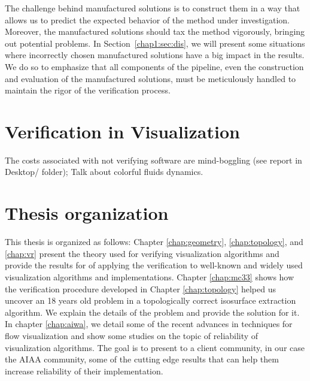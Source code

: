 The challenge behind manufactured solutions is to construct them in a
way that allows us to predict the expected behavior of the method
under investigation.  Moreover, the manufactured solutions should tax
the method vigorously, bringing out potential problems. In
Section~\ref{chap1:sec:dis}, we will present some situations where
incorrectly chosen manufactured solutions have a big impact in the
results.  We do so to emphasize that all components of the pipeline,
even the construction and evaluation of the manufactured solutions,
must be meticulously handled to maintain the rigor of the verification
process.

\section{Verification in Visualization}

%

The costs associated with not verifying software are mind-boggling (see report in Desktop/ folder);
Talk about colorful fluids dynamics.

\section{Thesis organization}

This thesis is organized as follows: Chapter \ref{chap:geometry}, \ref{chap:topology}, and \ref{chap:vr} present the theory used for verifying visualization algorithms and provide the results for of applying the verification to well-known and widely used visualization algorithms and implementations. Chapter \ref{chap:mc33} shows how the verification procedure developed in Chapter \ref{chap:topology} helped us uncover an 18 years old problem in a topologically correct isosurface extraction algorithm. We explain the details of the problem and provide the solution for it. In chapter \ref{chap:aiwa}, we detail some of the recent advances in techniques for flow visualization and show some studies on the topic of reliability of visualization algorithms. The goal is to present to a client community, in our case the AIAA community, some of the cutting edge results that can help them increase reliability of their implementation.

